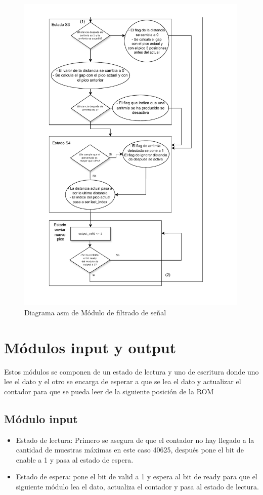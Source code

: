 \begin{figure}[h!]
    \centering
    \includegraphics[width=0.99\textwidth]{./Images/img_implementacion_hw/Diagramaasmarritmias2.pdf}
    \caption{Diagrama asm de Módulo de filtrado de señal}
    \label{fig:Diagramaasmarritmias2}
\end{figure} 
\FloatBarrier
\section {Módulos input y output}
Estos módulos se componen de un estado de lectura y uno de escritura donde uno lee el dato y el otro se encarga de esperar a que se lea el dato y actualizar 
el contador para que se pueda leer de la siguiente posición de la ROM

\subsection{Módulo input}
\begin{itemize}
    \item Estado de lectura: Primero se asegura de que el contador no hay llegado a la cantidad de muestras máximas en este caso 40625, después pone el bit de enable a 1 
    y pasa al estado de espera.
    \item Estado de espera: pone el bit de valid a 1 y espera al bit de ready para que el siguiente módulo lea el dato, actualiza el contador y pasa al estado de lectura.
\end{itemize}

